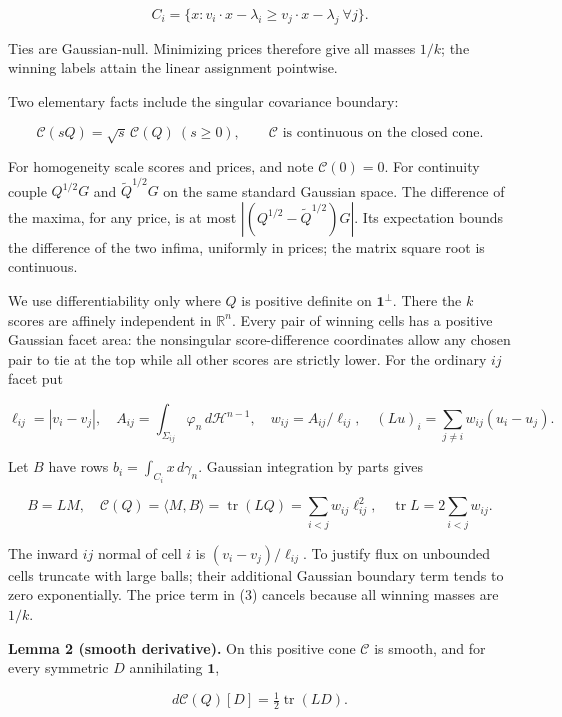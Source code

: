 \documentclass[
  11pt,
]{article}
\begin{document}
\[
 C_i=\{x:v_i\cdot x-\lambda_i\ge v_j\cdot x-\lambda_j\ \forall j\}.
                                                               \tag{4}
\]

Ties are Gaussian-null. Minimizing prices therefore give all masses
\(1/k\); the winning labels attain the linear assignment pointwise.

Two elementary facts include the singular covariance boundary:

\[
 \mathcal C(sQ)=\sqrt{s}\,\mathcal C(Q)\ (s\ge0),
 \qquad \mathcal C\text{ is continuous on the closed cone}.       \tag{5}
\]

For homogeneity scale scores and prices, and note \(\mathcal C(0)=0\).
For continuity couple \(Q^{1/2}G\) and \(\widetilde Q^{1/2}G\) on the
same standard Gaussian space. The difference of the maxima, for any
price, is at most \(|(Q^{1/2}-\widetilde Q^{1/2})G|\). Its expectation
bounds the difference of the two infima, uniformly in prices; the matrix
square root is continuous.

We use differentiability only where \(Q\) is positive definite on
\(\mathbf1^\perp\). There the \(k\) scores are affinely independent in
\(\mathbb R^n\). Every pair of winning cells has a positive Gaussian
facet area: the nonsingular score-difference coordinates allow any
chosen pair to tie at the top while all other scores are strictly lower.
For the ordinary \(ij\) facet put

\[
 \ell_{ij}=|v_i-v_j|,
 \quad A_{ij}=\int_{\Sigma_{ij}}\varphi_n\,d\mathcal H^{n-1},
 \quad w_{ij}=A_{ij}/\ell_{ij},
 \quad (Lu)_i=\sum_{j\ne i}w_{ij}(u_i-u_j).               \tag{6}
\]

Let \(B\) have rows \(b_i=\int_{C_i}x\,d\gamma_n\). Gaussian integration
by parts gives

\[
 B=LM,\quad \mathcal C(Q)=\langle M,B\rangle
      =\operatorname{tr}(LQ)=\sum_{i<j}w_{ij}\ell_{ij}^2,
 \quad \operatorname{tr}L=2\sum_{i<j}w_{ij}.             \tag{7}
\]

The inward \(ij\) normal of cell \(i\) is \((v_i-v_j)/\ell_{ij}\). To
justify flux on unbounded cells truncate with large balls; their
additional Gaussian boundary term tends to zero exponentially. The price
term in (3) cancels because all winning masses are \(1/k\).

\textbf{Lemma 2 (smooth derivative).} On this positive cone
\(\mathcal C\) is smooth, and for every symmetric \(D\) annihilating
\(\mathbf1\),

\[
 d\mathcal C(Q)[D]=\tfrac12\operatorname{tr}(LD).         \tag{8}
\]
\end{document}
